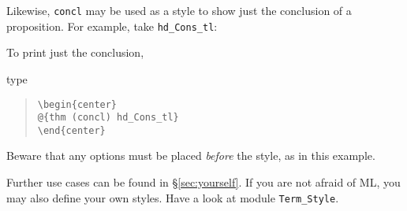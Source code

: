 \begin{isabellebody}
\begin{isamarkuptext}
  Likewise, \verb!concl! may be used as a style to show just the
  conclusion of a proposition. For example, take \verb!hd_Cons_tl!:
  \begin{center}
  \end{center}
  To print just the conclusion,
  \begin{center}
  \end{center}
  type
  \begin{quote}
    \verb!\begin{center}!\\
    \verb!@!\verb!{thm (concl) hd_Cons_tl}!\\
    \verb!\end{center}!
  \end{quote}
  Beware that any options must be placed \emph{before}
  the style, as in this example.

  Further use cases can be found in \S\ref{sec:yourself}.
  If you are not afraid of ML, you may also define your own styles.
  Have a look at module \verb|Term_Style|.%
\end{isamarkuptext}%
\isamarkuptrue%
%
\isadelimtheory
%
\endisadelimtheory
%
\isatagtheory
%
\endisatagtheory
{\isafoldtheory}%
%
\isadelimtheory
%
\endisadelimtheory
\end{isabellebody}%
